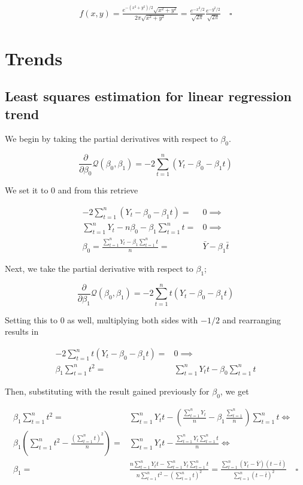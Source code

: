 \documentclass[]{book}
\begin{document}
\begin{gather*} 
  f(x,y) = \frac{e^{-(x^2+y^2)/2}\sqrt{x^2 + y^2}}{2\pi \sqrt{x^2 + y^2}} = \frac{e^{-x^2/2}}{\sqrt{2\pi}}\frac{e^{-y^2/2}}{\sqrt{2\pi}} \quad \square
\end{gather*}

\chapter{Trends}\label{trends}

\section{Least squares estimation for linear regression
trend}\label{least-squares-estimation-for-linear-regression-trend}

We begin by taking the partial derivatives with respect to \(\beta_0\).

\[
\frac{\partial}{\partial{\beta_0}} \mathcal{Q}(\beta_0, \beta_1) =
  -2\sum_{t=1}^n (Y_t - \beta_0 - \beta_1 t)
\]

We set it to \(0\) and from this retrieve

\begin{align*}
-2\sum_{t=1}^n (Y_t - \beta_0 - \beta_1 t) = & 0 \implies \\
\sum_{t=1}^n Y_t - n\beta_0 - \beta_1 \sum_{t=1}^n t = & 0 \implies \\
\beta_0 = \frac{\sum_{t=1}^n Y_t - \beta_1 \sum_{t=1}^n t}{n} = &
  \bar{Y} - \beta_1 \bar{t}
\end{align*}

Next, we take the partial derivative with respect to \(\beta_1\);

\[
\frac{\partial}{\partial{\beta_1}} \mathcal{Q}(\beta_0, \beta_1) =
  -2\sum_{t=1}^n t(Y_t - \beta_0 - \beta_1 t)
\]

Setting this to \(0\) as well, multiplying both sides with \(-1/2\) and
rearranging results in

\begin{align*}
-2\sum_{t=1}^n t (Y_t - \beta_0 - \beta_1 t) = & 0 \implies \\
\beta_1 \sum_{t=1}^n t^2 = & \sum_{t=1}^n Y_t t - \beta_0 \sum_{t=1}^n t
\end{align*}

Then, substituting with the result gained previously for \(\beta_0\), we
get

\begin{align*}
\beta_1 \sum_{t=1}^n t^2 = & \sum_{t=1}^n Y_t t - 
 \left( \frac{\sum_{t=1}^n Y_t}{n} - \beta_1 \frac{\sum_{t=1}^n}{n} \right)
 \sum_{t=1}^n t \iff \\
\beta_1 \left( \sum_{t=1}^n t^2 - \frac{(\sum_{t=1}^n t)^2}{n} \right) = & 
  \sum_{t=1}^n Y_t t - \frac{\sum_{t=1}^n Y_t \sum_{t=1}^n t}{n} \iff \\
\beta_1 = & \frac{n\sum_{t=1}^n Y_tt - \sum_{t=1}^nY_t \sum_{t=1}^n t}{n \sum_{t=1}^n t^2 - \left( \sum_{t=1}^n t \right)^2} = 
  \frac{\sum_{t=1}^n (Y_t - \bar{Y})(t-\bar{t})}{\sum_{t=1}^n (t-\bar{t})^2} \quad \square
\end{align*}
\end{document}
